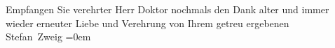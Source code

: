 \pstart
           Empfangen Sie verehrter Herr Doktor nochmals den Dank alter und immer wieder
               erneuter Liebe und Verehrung von Ihrem getreu ergebenen{\\[\baselineskip]}\spacefill\mbox{Stefan Zweig}\pend
           \leftskip=0em{}\endnumbering{}  \newcommand{\dateiname}{L03641}\newcommand{\titel}{Stefan Zweig an Arthur Schnitzler, 23. 5. 1913}\newcommand{\editorInnen}{Selma Jahnke und Martin Anton Müller}
